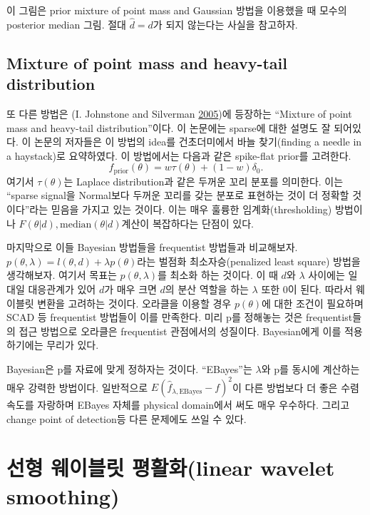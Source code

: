 \documentclass[b5paper,]{book}
\theoremstyle{definition}
\theoremstyle{definition}
\theoremstyle{definition}
\theoremstyle{remark}
\begin{document}
이 그림은 prior mixture of point mass and Gaussian 방법을 이용했을 때
모수의 posterior median 그림. 절대 \(\hat{d} = d\)가 되지 않는다는
사실을 참고하자.

\subsection{Mixture of point mass and heavy-tail
distribution}\label{mixture-of-point-mass-and-heavy-tail-distribution}

또 다른 방법은 (I. Johnstone and Silverman
\protect\hyperlink{ref-Johnstone2005}{2005})에 등장하는 ``Mixture of
point mass and heavy-tail distribution''이다. 이 논문에는 sparse에 대한
설명도 잘 되어있다. 이 논문의 저자들은 이 방법의 idea를 건초더미에서
바늘 찾기(finding a needle in a haystack)로 요약하였다. 이 방법에서는
다음과 같은 spike-flat prior를 고려한다.
\[f_{\text{prior}}(\theta)=w \tau(\theta)+ (1-w)\delta_{0}.\] 여기서
\(\tau(\theta)\)는 Laplace distribution과 같은 두꺼운 꼬리 분포를
의미한다. 이는 ``sparse signal을 Normal보다 두꺼운 꼬리를 갖는 분포로
표현하는 것이 더 정확할 것이다''라는 믿음을 가지고 있는 것이다. 이는
매우 훌륭한 임계화(thresholding) 방법이나
\(F(\theta |d), \text{median}(\theta |d)\)계산이 복잡하다는 단점이 있다.

마지막으로 이들 Bayesian 방법들을 frequentist 방법들과 비교해보자.
\(p(\theta,\lambda)=l(\theta, d)+\lambda p(\theta)\)라는 벌점화
최소자승(penalized least square) 방법을 생각해보자. 여기서 목표는
\(p(\theta,\lambda)\)를 최소화 하는 것이다. 이 때 \(d\)와 \(\lambda\)
사이에는 일대일 대응관계가 있어 \(d\)가 매우 크면 \(d\)의 분산 역할을
하는 \(\lambda\) 또한 0이 된다. 따라서 웨이블릿 변환을 고려하는 것이다.
오라클을 이용할 경우 \(p(\theta)\)에 대한 조건이 필요하며 SCAD 등
frequentist 방법들이 이를 만족한다. 미리 p를 정해놓는 것은
frequentist들의 접근 방법으로 오라클은 frequentist 관점에서의 성질이다.
Bayesian에게 이를 적용하기에는 무리가 있다.

Bayesian은 p를 자료에 맞게 정하자는 것이다. ``EBayes''는 \(\lambda\)와
p를 동시에 계산하는 매우 강력한 방법이다. 일반적으로
\(E(\hat{f}_{\lambda, \text{EBayes}}-f)^{2}\)이 다른 방법보다 더 좋은
수렴속도를 자랑하며 EBayes 자체를 physical domain에서 써도 매우
우수하다. 그리고 change point of detection등 다른 문제에도 쓰일 수 있다.

\section{선형 웨이블릿 평활화(linear wavelet
smoothing)}\label{--linear-wavelet-smoothing}
\end{document}
